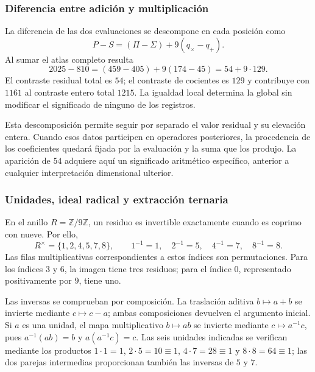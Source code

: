 

\subsubsection{Diferencia entre adición y multiplicación}

La diferencia de las dos evaluaciones se descompone en cada posición como
\begin{equation}
 P-S=(\Pi-\Sigma)+9(q_\times-q_+).
 \label{eq:app-difference-local}
\end{equation}
Al sumar el atlas completo resulta
\begin{equation}
 2025-810=(459-405)+9(174-45)=54+9\cdot129.
 \label{eq:app-difference-global}
\end{equation}
El contraste residual total es $54$; el contraste de cocientes es $129$ y contribuye con $1161$ al contraste entero total $1215$. La igualdad local determina la global sin modificar el significado de ninguno de los registros.

Esta descomposición permite seguir por separado el valor residual y su elevación entera. Cuando esos datos participen en operadores posteriores, la procedencia de los coeficientes quedará fijada por la evaluación y la suma que los produjo. La aparición de $54$ adquiere aquí un significado aritmético específico, anterior a cualquier interpretación dimensional ulterior.

\subsubsection{Unidades, ideal radical y extracción ternaria}

En el anillo $R=\mathbb Z/9\mathbb Z$, un residuo es invertible exactamente cuando es coprimo con nueve. Por ello,
\[
 R^\times=\{1,2,4,5,7,8\},
 \qquad 1^{-1}=1,\quad2^{-1}=5,\quad4^{-1}=7,\quad8^{-1}=8.
\]
Las filas multiplicativas correspondientes a estos índices son permutaciones. Para los índices $3$ y $6$, la imagen tiene tres residuos; para el índice $0$, representado positivamente por $9$, tiene uno.

Las inversas se comprueban por composición. La traslación aditiva $b\mapsto a+b$ se invierte mediante $c\mapsto c-a$; ambas composiciones devuelven el argumento inicial. Si $a$ es una unidad, el mapa multiplicativo $b\mapsto ab$ se invierte mediante $c\mapsto a^{-1}c$, pues $a^{-1}(ab)=b$ y $a(a^{-1}c)=c$. Las seis unidades indicadas se verifican mediante los productos $1\cdot1=1$, $2\cdot5=10\equiv1$, $4\cdot7=28\equiv1$ y $8\cdot8=64\equiv1$; las dos parejas intermedias proporcionan también las inversas de $5$ y $7$.

